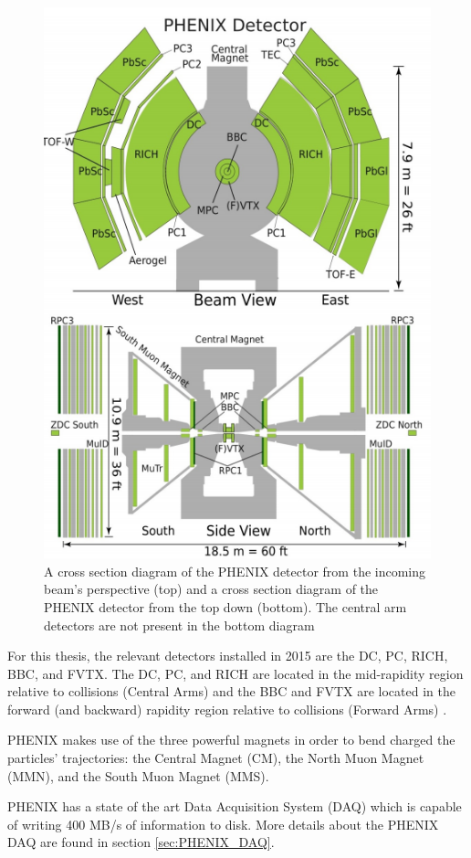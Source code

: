 \begin{figure}[!h]
\begin{center}
\includegraphics[width=0.7\linewidth]{figs/phenix_schematic.png}
\caption{A cross section diagram of the PHENIX detector from the incoming beam's perspective (top) and a cross section diagram of the PHENIX detector from the top down (bottom). The central arm detectors are not present in the bottom diagram}
\label{fig:phenix_schematic}
\end{center}
\end{figure}

 For this thesis, the relevant detectors installed in 2015 are the DC, PC, RICH, BBC, and FVTX. The DC, PC, and RICH are located in the mid-rapidity region relative to collisions (Central Arms) and the BBC and FVTX are located in the forward (and backward) rapidity region relative to collisions (Forward Arms) \cite{Adcox2003469}. 

PHENIX makes use of the three powerful magnets in order to bend charged the particles' trajectories: the Central Magnet (CM), the North Muon Magnet (MMN), and the South Muon Magnet (MMS).

PHENIX has a state of the art Data Acquisition System (DAQ) which is capable of writing 400 MB/s of information to disk. More details about the PHENIX DAQ are found in section \ref{sec:PHENIX_DAQ}.

